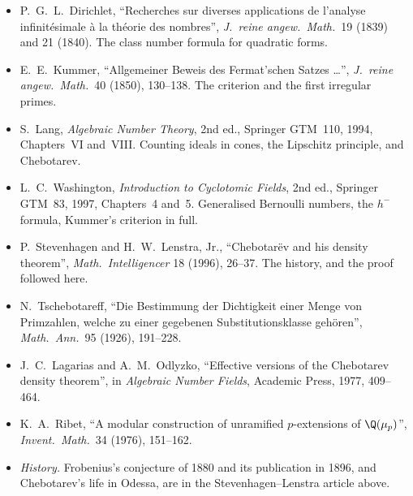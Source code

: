 \begin{itemize}
\item P.~G.~L.~Dirichlet, ``Recherches sur diverses applications de l'analyse infinit\'esimale \`a la th\'eorie des nombres'', \emph{J.\ reine angew.\
Math.}\ 19 (1839) and 21 (1840). The class number formula for quadratic forms.
\item E.~E.~Kummer, ``Allgemeiner Beweis des Fermat'schen Satzes \dots'', \emph{J.\ reine angew.\ Math.}\ 40 (1850), 130--138. The criterion and the
first irregular primes.
\item S.~Lang, \emph{Algebraic Number Theory}, 2nd ed., Springer GTM~110, 1994, Chapters~VI and~VIII. Counting ideals in cones, the Lipschitz
principle, and Chebotarev.
\item L.~C.~Washington, \emph{Introduction to Cyclotomic Fields}, 2nd ed., Springer GTM~83, 1997, Chapters~4 and~5. Generalised Bernoulli numbers,
the $h^-$ formula, Kummer's criterion in full.
\item P.~Stevenhagen and H.~W.~Lenstra, Jr., ``Chebotar\"ev and his density theorem'', \emph{Math.\ Intelligencer} 18 (1996), 26--37. The history, and
the proof followed here.
\item N.~Tschebotareff, ``Die Bestimmung der Dichtigkeit einer Menge von Primzahlen, welche zu einer gegebenen Substitutionsklasse geh\"oren'',
\emph{Math.\ Ann.}\ 95 (1926), 191--228.
\item J.~C.~Lagarias and A.~M.~Odlyzko, ``Effective versions of the Chebotarev density theorem'', in \emph{Algebraic Number Fields}, Academic Press,
1977, 409--464.
\item K.~A.~Ribet, ``A modular construction of unramified $p$-extensions of $\Q(\mu_p)$'', \emph{Invent.\ Math.}\ 34 (1976), 151--162.
\item \emph{History.} Frobenius's conjecture of 1880 and its publication in 1896, and Chebotarev's life in Odessa, are
in the Stevenhagen--Lenstra article above.
\end{itemize}
